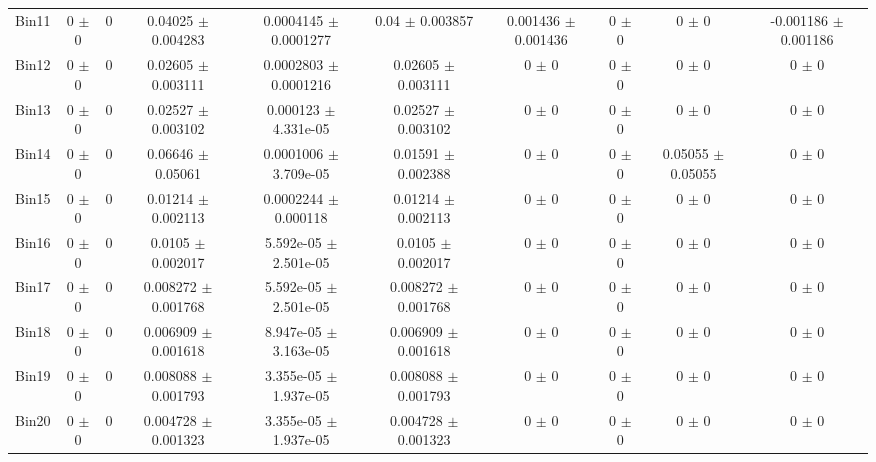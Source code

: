 \begin{tabular}{@{\extracolsep{4pt}}lccccccccc@{}}
     Bin11 & 0 $\pm$ 0 & 0 & 0.04025 $\pm$ 0.004283 & 0.0004145 $\pm$ 0.0001277 & 0.04 $\pm$ 0.003857 & 0.001436 $\pm$ 0.001436 & 0 $\pm$ 0 & 0 $\pm$ 0 & -0.001186 $\pm$ 0.001186 \\ 
     Bin12 & 0 $\pm$ 0 & 0 & 0.02605 $\pm$ 0.003111 & 0.0002803 $\pm$ 0.0001216 & 0.02605 $\pm$ 0.003111 & 0 $\pm$ 0 & 0 $\pm$ 0 & 0 $\pm$ 0 & 0 $\pm$ 0 \\ 
     Bin13 & 0 $\pm$ 0 & 0 & 0.02527 $\pm$ 0.003102 & 0.000123 $\pm$ 4.331e-05 & 0.02527 $\pm$ 0.003102 & 0 $\pm$ 0 & 0 $\pm$ 0 & 0 $\pm$ 0 & 0 $\pm$ 0 \\ 
     Bin14 & 0 $\pm$ 0 & 0 & 0.06646 $\pm$ 0.05061 & 0.0001006 $\pm$ 3.709e-05 & 0.01591 $\pm$ 0.002388 & 0 $\pm$ 0 & 0 $\pm$ 0 & 0.05055 $\pm$ 0.05055 & 0 $\pm$ 0 \\ 
     Bin15 & 0 $\pm$ 0 & 0 & 0.01214 $\pm$ 0.002113 & 0.0002244 $\pm$ 0.000118 & 0.01214 $\pm$ 0.002113 & 0 $\pm$ 0 & 0 $\pm$ 0 & 0 $\pm$ 0 & 0 $\pm$ 0 \\ 
     Bin16 & 0 $\pm$ 0 & 0 & 0.0105 $\pm$ 0.002017 & 5.592e-05 $\pm$ 2.501e-05 & 0.0105 $\pm$ 0.002017 & 0 $\pm$ 0 & 0 $\pm$ 0 & 0 $\pm$ 0 & 0 $\pm$ 0 \\ 
     Bin17 & 0 $\pm$ 0 & 0 & 0.008272 $\pm$ 0.001768 & 5.592e-05 $\pm$ 2.501e-05 & 0.008272 $\pm$ 0.001768 & 0 $\pm$ 0 & 0 $\pm$ 0 & 0 $\pm$ 0 & 0 $\pm$ 0 \\ 
     Bin18 & 0 $\pm$ 0 & 0 & 0.006909 $\pm$ 0.001618 & 8.947e-05 $\pm$ 3.163e-05 & 0.006909 $\pm$ 0.001618 & 0 $\pm$ 0 & 0 $\pm$ 0 & 0 $\pm$ 0 & 0 $\pm$ 0 \\ 
     Bin19 & 0 $\pm$ 0 & 0 & 0.008088 $\pm$ 0.001793 & 3.355e-05 $\pm$ 1.937e-05 & 0.008088 $\pm$ 0.001793 & 0 $\pm$ 0 & 0 $\pm$ 0 & 0 $\pm$ 0 & 0 $\pm$ 0 \\ 
     Bin20 & 0 $\pm$ 0 & 0 & 0.004728 $\pm$ 0.001323 & 3.355e-05 $\pm$ 1.937e-05 & 0.004728 $\pm$ 0.001323 & 0 $\pm$ 0 & 0 $\pm$ 0 & 0 $\pm$ 0 & 0 $\pm$ 0 \\ 
\hline\hline
  \end{tabular}
